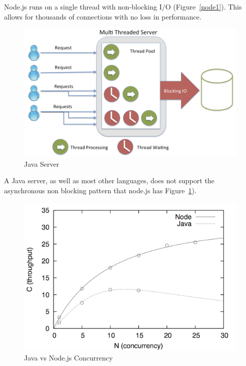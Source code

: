 \documentclass[12pt, letterpaper]{report}
\begin{document}
\par
Node.js runs on a single thread with non-blocking I/O (Figure~\ref{node1}).  This allows for thousands of connections with no loss in performance.

\begin{figure}[htp]
\centering
\includegraphics[scale=0.3]{threading_java.png}
\caption{Java Server \cite{fullStackJS}}
\label{node2}
\end{figure}

\par
A Java server, as well as most other languages, does not support the asynchronous non blocking pattern that node.js has Figure~\ref{node2}).

\begin{figure}[htp]
\centering
\includegraphics[scale=3.0]{javavsnodejs.png}
\caption{Java vs Node.js Concurrency \cite{javaVSnode}}
\end{figure}
\end{document}
